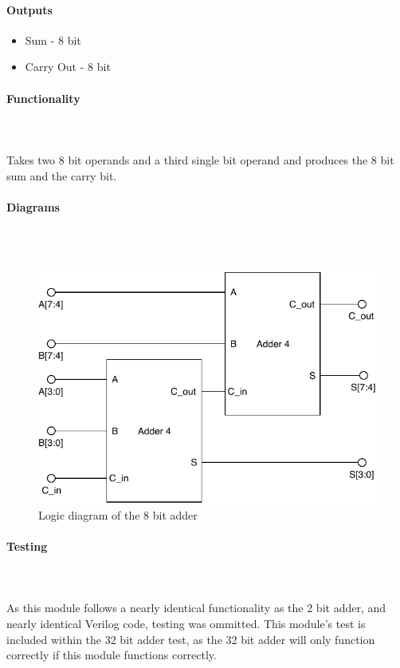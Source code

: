 \documentclass{article}
\begin{document}
       \paragraph{Outputs}
       \begin{itemize}
           \item Sum - 8 bit
           \item Carry Out - 8 bit
       \end{itemize}
   
       \paragraph{Functionality}
       \hfill\\\\
       Takes two 8 bit operands and a third single bit operand and produces the
       8 bit sum and the carry bit.
   
       \paragraph{Diagrams}
       \hfill\\\\
       \begin{figure}[H]
           \centering
           \includegraphics{../diagrams/alu/adder/adder_8.pdf}
           \caption{Logic diagram of the 8 bit adder}
       \end{figure}
   
       \paragraph{Testing}
       \hfill\\\\
       As this module follows a nearly identical functionality as the 2
       bit adder, and nearly identical Verilog code, testing was ommitted.
       This module's test is included within the 32 bit adder test, as the
       32 bit adder will only function correctly if this module functions
       correctly.
    
\end{document}
